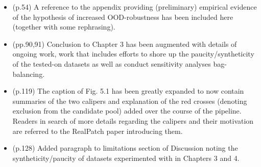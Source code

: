 \begin{itemize}
    \item (p.54) A reference to the appendix providing (preliminary) empirical evidence of the
        hypothesis of increased OOD-robustness has been included here (together with some
        rephrasing).
    \item (pp.90,91) Conclusion to Chapter 3 has been augmented with details of ongoing work, work
        that includes efforts to shore up the paucity/syntheticity of the tested-on datasets as
        well as conduct sensitivity analyses \wrt{} bag-balancing.
    \item (p.119) The caption of Fig. 5.1 has been greatly expanded to now contain summaries of the
        two calipers and explanation of the red crosses (denoting exclusion from the candidate
        pool) added over the course of the pipeline. Readers in search of more details regarding
        the calipers and their motivation are referred to the RealPatch paper introducing them.
    \item (p.128) Added paragraph to limitations section of Discussion noting the
        syntheticity/paucity of datasets experimented with in Chapters 3 and 4.
\end{itemize}
